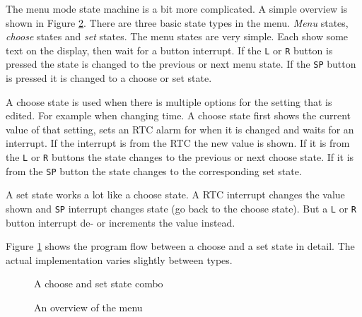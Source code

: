 \documentclass{awac02}
\begin{document}
The menu mode state machine is a bit more complicated. A simple overview is
shown in Figure \ref{fig:menu-flowchart}. There are three basic state types in the
menu. \emph{Menu} states, \emph{choose} states and \emph{set} states. The menu
states are very simple. Each show some text on the display, then wait for a
button interrupt. If the \texttt{L} or \texttt{R} button is pressed the
state is changed to the previous or next menu state. If the \texttt{SP} button
is pressed it is changed to a choose or set state.

A choose state is used when there is multiple options for the setting that is
edited. For example when changing time. A choose state first shows the current
value of that setting, sets an RTC alarm for when it is changed and waits for
an interrupt. If the interrupt is from the RTC the new value is shown. If it is
from the \texttt{L} or \texttt{R} buttons the state changes to the previous or
next choose state. If it is from the \texttt{SP} button the state changes to
the corresponding set state.

A set state works a lot like a choose state. A RTC interrupt changes the value
shown and \texttt{SP} interrupt changes state (go back to the choose state).
But a \texttt{L} or \texttt{R} button interrupt de- or increments the value
instead.

Figure \ref{fig:choose-and-set-state} shows the program flow between a choose
and a set state in detail. The actual implementation varies slightly
between types.

\begin{figure}[h]
    \centering
    
    \caption{A choose and set state combo}
    \label{fig:choose-and-set-state}
\end{figure}

\begin{figure}[h]
    \centering
    
    \label{fig:menu-flowchart}
    \caption{An overview of the menu}
\end{figure}
\end{document}
